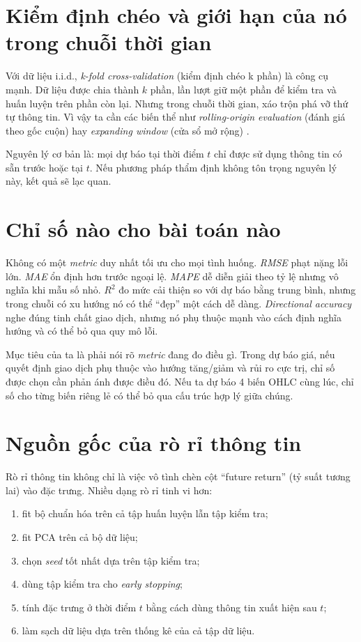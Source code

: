\section{Kiểm định chéo và giới hạn của nó trong chuỗi thời gian}

Với dữ liệu i.i.d., \emph{k-fold cross-validation} (kiểm định chéo k phần) là công cụ mạnh. Dữ liệu được chia thành \(k\) phần, lần lượt giữ một phần để kiểm tra và huấn luyện trên phần còn lại. Nhưng trong chuỗi thời gian, xáo trộn phá vỡ thứ tự thông tin. Vì vậy ta cần các biến thể như \emph{rolling-origin evaluation} (đánh giá theo gốc cuộn) hay \emph{expanding window} (cửa sổ mở rộng) \citep{hyndman2021fpp3}.

Nguyên lý cơ bản là: mọi dự báo tại thời điểm \(t\) chỉ được sử dụng thông tin có sẵn trước hoặc tại \(t\). Nếu phương pháp thẩm định không tôn trọng nguyên lý này, kết quả sẽ lạc quan.

\section{Chỉ số nào cho bài toán nào}

Không có một \emph{metric} duy nhất tối ưu cho mọi tình huống. \emph{RMSE} phạt nặng lỗi lớn. \emph{MAE} ổn định hơn trước ngoại lệ. \emph{MAPE} dễ diễn giải theo tỷ lệ nhưng vô nghĩa khi mẫu số nhỏ. $R^2$ đo mức cải thiện so với dự báo bằng trung bình, nhưng trong chuỗi có xu hướng nó có thể ``đẹp'' một cách dễ dàng. \emph{Directional accuracy} nghe đúng tinh chất giao dịch, nhưng nó phụ thuộc mạnh vào cách định nghĩa hướng và có thể bỏ qua quy mô lỗi.

Mục tiêu của ta là phải nói rõ \emph{metric} đang đo điều gì. Trong dự báo giá, nếu quyết định giao dịch phụ thuộc vào hướng tăng/giảm và rủi ro cực trị, chỉ số được chọn cần phản ánh được điều đó. Nếu ta dự báo 4 biến OHLC cùng lúc, chỉ số cho từng biến riêng lẻ có thể bỏ qua cấu trúc hợp lý giữa chúng.

\section{Nguồn gốc của rò rỉ thông tin}

Rò rỉ thông tin không chỉ là việc vô tình chèn cột ``future return'' (tỷ suất tương lai) vào đặc trưng. Nhiều dạng rò rỉ tinh vi hơn:

\begin{enumerate}
\item fit bộ chuẩn hóa trên cả tập huấn luyện lẫn tập kiểm tra;
\item fit PCA trên cả bộ dữ liệu;
\item chọn \emph{seed} tốt nhất dựa trên tập kiểm tra;
\item dùng tập kiểm tra cho \emph{early stopping};
\item tính đặc trưng ở thời điểm \(t\) bằng cách dùng thông tin xuất hiện sau \(t\);
\item làm sạch dữ liệu dựa trên thống kê của cả tập dữ liệu.
\end{enumerate}

